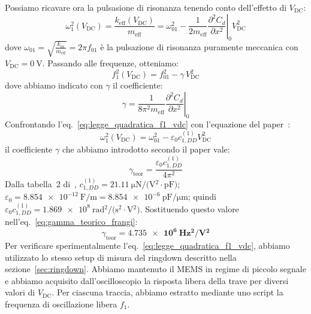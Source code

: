 \documentclass[11pt,a4paper]{article}
\begin{document}
\vspace{0.3cm}
\noindent 
Possiamo ricavare ora la pulsasione di risonanza tenendo conto dell'effetto di $V_{\text{DC}}$:
\begin{equation}
    \omega_1^2(V_{\text{DC}}) = \frac{k_{\text{eff}}(V_{\text{DC}})}{m_{\text{eff}}} = \omega_{01}^2 - \frac{1}{2 m_{\text{eff}}} \left. \frac{\partial^2 C_d}{\partial x^2} \right|_0 V_{\text{DC}}^2
\end{equation}
dove $\omega_{01} = \sqrt{\frac{k_m}{m_{\text{eff}}}} = 2\pi f_{01}$ è la pulsazione di risonanza puramente meccanica con $V_{\text{DC}} = \SI{0}{\volt}$. Passando alle frequenze, otteniamo:
\begin{equation}
    \label{eq:legge_quadratica_f1_vdc}
    f_1^2(V_{\text{DC}}) = f_{01}^2 - \gamma \, V_{\text{DC}}^2
\end{equation}
dove abbiamo indicato con $\gamma$ il coefficiente:
\begin{equation}
    \gamma = \frac{1}{8\pi^2 m_{\text{eff}}} \left. \frac{\partial^2 C_d}{\partial x^2} \right|_0
\end{equation}
Confrontando l'eq.~\eqref{eq:legge_quadratica_f1_vdc} con l'equazione del paper~\cite{frangi2023}:
\begin{equation}
    \omega_1^2(V_{\text{DC}}) = \omega_{01}^2 - \varepsilon_0 c_{1,DD}^{(1)} V_{\text{DC}}^2
\end{equation}
il coefficiente $\gamma$ che abbiamo introdotto secondo il paper vale:
\begin{equation}
    \label{eq:gamma_teorico_frangi}
    \gamma_{\text{teor}} = \frac{\varepsilon_0 c_{1,DD}^{(1)}}{4\pi^2}
\end{equation}
Dalla tabella~2 di~\cite{frangi2023}, $c_{1,DD}^{(1)} = \SI{21.11}{\micro\newton/(\volt^2 \cdot \pico\farad)}$; $\varepsilon_0 = \SI{8.854e-12}{\farad/\meter} = \SI{8.854e-6}{\pico\farad/\micro\meter}$; quindi $\varepsilon_0 c_{1,DD}^{(1)} = \SI{1.869e8}{\radian^2/(\second^2 \cdot \volt^2)}$. Sostituendo questo valore nell'eq.~\eqref{eq:gamma_teorico_frangi}:
\begin{equation}
    \gamma_{\text{teor}} = \mathbf{\SI{4.735e6}{\hertz^2/\volt^2}}
\end{equation}
Per verificare sperimentalmente l'eq.~\eqref{eq:legge_quadratica_f1_vdc}, abbiamo utilizzato lo stesso setup di misura del ringdown descritto nella sezione~\ref{sec:ringdown}. Abbiamo mantenuto il MEMS in regime di piccolo segnale e abbiamo acquisito dall'oscilloscopio la risposta libera della trave per diversi valori di $V_{\text{DC}}$. Per ciascuna traccia, abbiamo estratto mediante uno script la frequenza di oscillazione libera $f_1$.
\end{document}

